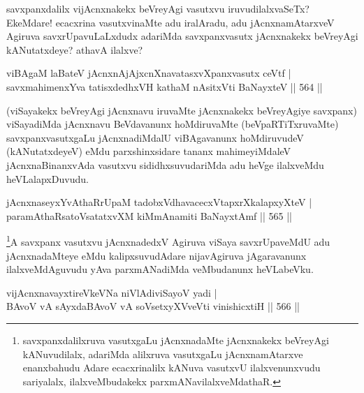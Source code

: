 \begin{artha}
savxpanxdalilx vijAcnxnakekx beVreyAgi vasutxvu iruvudilalxvaSeTx? EkeMdare! ecacxrina vasutxvinaMte adu iralAradu, adu jAcnxnamAtarxveV Agiruva savxrUpavuLaLxdudx adariMda savxpanxvasutx jAcnxnakekx beVreyAgi kANutatxdeye? athavA ilalxve?
\end{artha}


\begin{shl}
viBAgaM laBateV jAcnxnAjAjxcnXnavatasxvXpanxvasutx ceVtf | \\
savxmahimenxYva tatisxdedhxVH kathaM nAsitxVti BaNayxteV \hfill||  564 ||  
\end{shl}

\begin{artha}
(viSayakekx beVreyAgi jAcnxnavu iruvaMte jAcnxnakekx beVreyAgiye savxpanx) viSayadiMda jAcnxnavu BeVdavanunx hoMdiruvaMte (beVpaRTiTxruvaMte) savxpanxvasutxgaLu jAcnxnadiMdalU viBAgavanunx hoMdiruvudeV (kANutatxdeyeV) eMdu parxshinxsidare tananx mahimeyiMdaleV jAcnxnaBinanxvAda vasutxvu sididhxsuvudariMda adu heVge ilalxveMdu heVLalapxDuvudu.
\end{artha}


\begin{shl}
jAcnxnaseyxYvAthaRrUpaM tadobxVdhavacecxVtapxrXkalapxyXteV | \\
paramAthaRsatoV\s satatxvXM kiMmAnamiti BaNayxtAmf \hfill||  565 ||  
\end{shl}

\begin{artha}
\footnote{savxpanxdalilxruva vasutxgaLu jAcnxnadaMte jAcnxnakekx beVreyAgi kANuvudilalx, adariMda alilxruva vasutxgaLu jAcnxnamAtarxve enanxbahudu Adare ecacxrinalilx kANuva vasutxvU ilalxvenunxvudu sariyalalx, ilalxveMbudakekx parxmANavilalxveMdathaR.}A savxpanx vasutxvu jAcnxnadedxV Agiruva viSaya savxrUpaveMdU adu jAcnxnadaMteye eMdu kalipxsuvudAdare nijavAgiruva jAgaravanunx ilalxveMdAguvudu yAva parxmANadiMda veMbudanunx heVLabeVku.
\end{artha}


\begin{shl}
\footnotemark[2]vijAcnxnavayxtireVkeVNa niVlAdiviSayoV yadi | \\
BAvoV vA sAyxdaBAvoV vA soV\s setxyXVveVti vinishicxtiH \hfill||  566 ||  
\end{shl}

